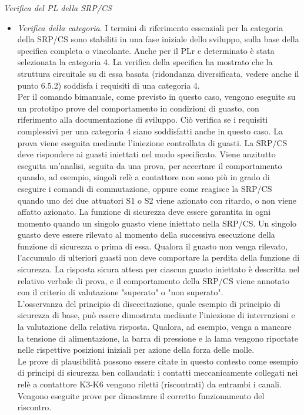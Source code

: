 \textit{Verifica del PL della SRP/CS}
\begin{itemize}
    \item \textit{Verifica della categoria}. I termini di riferimento essenziali per la categoria della SRP/CS sono stabiliti in una fase iniziale dello sviluppo, sulla base della specifica completa o vincolante. Anche per il PLr e determinato è stata selezionata la categoria 4. La verifica della specifica ha mostrato che la struttura circuitale su di essa basata (ridondanza diversificata, vedere anche il punto 6.5.2) soddisfa i requisiti di una categoria 4.\\
    Per il comando bimanuale, come previsto in questo caso, vengono eseguite su un prototipo prove del comportamento in condizioni di guasto, con riferimento alla documentazione di sviluppo. Ciò verifica se i requisiti complessivi per una categoria 4 siano soddisfatti anche in questo caso. La prova viene eseguita mediante l'iniezione controllata di guasti. La SRP/CS deve rispondere ai guasti iniettati nel modo specificato. Viene anzitutto eseguita un'analisi, seguita da una prova, per accertare il comportamento quando, ad esempio, singoli relè a contattore non sono più in grado di eseguire i comandi di commutazione, oppure come reagisce la SRP/CS quando uno dei due attuatori S1 o S2 viene azionato con ritardo, o non viene affatto azionato. La funzione di sicurezza deve essere garantita in ogni momento quando un singolo guasto viene iniettato nella SRP/CS. Un singolo guasto deve essere rilevato al momento della successiva esecuzione della funzione di sicurezza o prima di essa. Qualora il guasto non venga rilevato, l'accumulo di ulteriori guasti non deve comportare la perdita della funzione di sicurezza. La risposta sicura attesa per ciascun guasto iniettato è descritta nel relativo verbale di prova, e il comportamento della SRP/CS viene annotato con il criterio di valutazione "superato" o "non superato".\\
    L'osservanza del principio di diseccitazione, quale esempio di principio di sicurezza di base, può essere dimostrata mediante l'iniezione di interruzioni e la valutazione della relativa risposta. Qualora, ad esempio, venga a mancare la tensione di alimentazione, la barra di pressione e la lama vengono riportate nelle rispettive posizioni iniziali per azione della forza delle molle.\\
    Le prove di plausibilità possono essere citate in questo contesto come esempio di principi di sicurezza ben collaudati: i contatti meccanicamente collegati nei relè a contattore K3-K6 vengono riletti (riscontrati) da entrambi i canali. Vengono eseguite prove per dimostrare il corretto funzionamento del riscontro.

\end{itemize}
